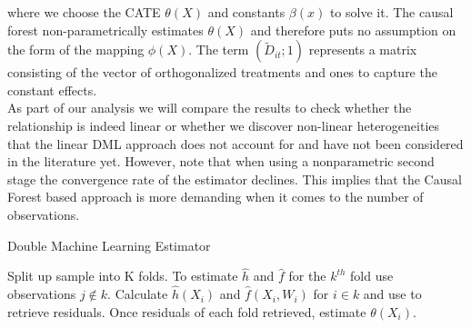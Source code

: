 where we choose the CATE $\theta(X)$ and constants $\beta(x)$ to solve it. The causal forest non-parametrically estimates $\theta(X)$ and therefore puts no assumption on the form of the mapping $\phi(X)$. The term $(\tilde{D}_{it}; 1)$ represents a matrix consisting of the vector of orthogonalized treatments and ones to capture the constant effects. \\
As part of our analysis we will compare the results to check whether the relationship is indeed linear or whether we discover non-linear heterogeneities that the linear DML approach does not account for and have not been considered in the literature yet. However, note that when using a nonparametric second stage the convergence rate of the estimator declines. This implies that the Causal Forest based approach is more demanding when it comes to the number of observations. 
\begin{algorithm} 
    \caption{Double Machine Learning Estimator}
    \label{alg:alg1}
    \begin{algorithmic}[1]
        \State Split up sample into K folds. 
        \State To estimate $\widehat{h}$ and $\widehat{f}$ for the $k^{th}$ fold use observations $j \notin k$. 
        \State Calculate $\widehat{h}(X_i)$ and $\widehat{f}(X_i, W_i)$ for $i \in k$ and use to retrieve residuals.
        \State Once residuals of each fold retrieved, estimate $\theta(X_i)$.
    \end{algorithmic}
\end{algorithm}